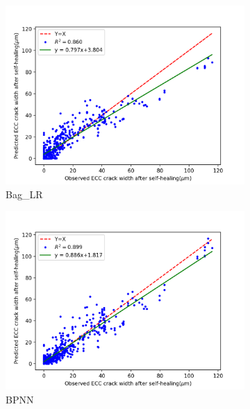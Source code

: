 \documentclass[11pt]{article}
\begin{document}
\begin{figure}[!h]
\begin{subfigure}{.35\textwidth}
		    \includegraphics[width = \linewidth]{02Bag_LR.png}
		    \caption{Bag\_LR}
	    	\end{subfigure}%
		\hspace{-1.4em}
		    \begin{subfigure}{0.35\textwidth}
		    \centering
		    \includegraphics[width = \linewidth]{02BPNN.png}
		    \caption{BPNN}
		    \end{subfigure}%
		\hspace{-1.4em}
		    \begin{subfigure}{0.35\textwidth}
		    \centering

\end{subfigure}
\end{figure}
\end{document}
